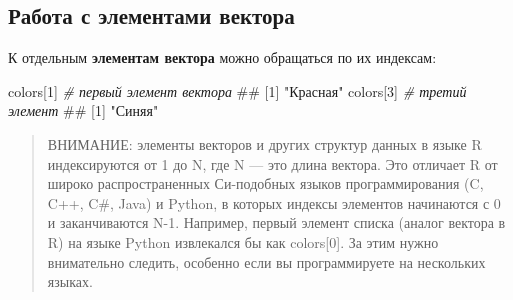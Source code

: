 \documentclass[]{book}
\newenvironment{Shaded}{\begin{snugshade}}{\end{snugshade}}
\newcommand{\KeywordTok}[1]{\textcolor[rgb]{0.13,0.29,0.53}{\textbf{#1}}}
\newcommand{\DataTypeTok}[1]{\textcolor[rgb]{0.13,0.29,0.53}{#1}}
\newcommand{\DecValTok}[1]{\textcolor[rgb]{0.00,0.00,0.81}{#1}}
\newcommand{\StringTok}[1]{\textcolor[rgb]{0.31,0.60,0.02}{#1}}
\newcommand{\CommentTok}[1]{\textcolor[rgb]{0.56,0.35,0.01}{\textit{#1}}}
\newcommand{\NormalTok}[1]{#1}
\begin{document}
\begin{Shaded}
\end{Shaded}

\subsection{Работа с элементами вектора}\label{vector_elements}

К отдельным \textbf{элементам вектора} можно обращаться по их индексам:

\begin{Shaded}
\begin{Highlighting}[]
\NormalTok{colors[}\DecValTok{1}\NormalTok{] }\CommentTok{# первый элемент вектора}
\NormalTok{## [1] "Красная"}
\NormalTok{colors[}\DecValTok{3}\NormalTok{] }\CommentTok{# третий элемент}
\NormalTok{## [1] "Синяя"}
\end{Highlighting}
\end{Shaded}

\begin{quote}
ВНИМАНИЕ: элементы векторов и других структур данных в языке R
индексируются от 1 до N, где N --- это длина вектора. Это отличает R от
широко распространенных Си-подобных языков программирования (C, C++,
C\#, Java) и Python, в которых индексы элементов начинаются с 0 и
заканчиваются N-1. Например, первый элемент списка (аналог вектора в R)
на языке Python извлекался бы как colors{[}0{]}. За этим нужно
внимательно следить, особенно если вы программируете на нескольких
языках.
\end{quote}
\end{document}

